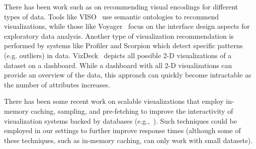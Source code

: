 There has been work such as\break
\cite{Mackinlay:1986:ADG:22949.22950, DBLP:journals/tvcg/MackinlayHS07} 
on recommending visual encodings for different types of data.
Tools like VISO~\cite{polowinski2013viso} use semantic ontologies to recommend visualizations,
while those like Voyager~\cite{wongvoyager2015} focus on the interface design aspects
for exploratory data analysis.
Another type of visualization recommendation is performed by systems like
Profiler and Scorpion \cite{DBLP:conf/avi/KandelPPHH12, scorpion} which detect specific 
patterns (e.g. outliers) in data.
VizDeck~\cite{DBLP:conf/sigmod/KeyHPA12}
depicts all possible 2-D visualizations of a dataset on a dashboard.
While a dashboard with all 2-D visualizations can provide an overview of the data, 
this approach can quickly become intractable as the number of attributes increases.


  There has been some recent work on
scalable visualizations that employ in-memory caching, sampling, and
pre-fetching to improve the interactivity of visualization systems
backed by
databases (e.g.,~\cite{doshi2003prefetching,DBLP:journals/corr/KimBPIMR14}).
Such techniques could be employed in our settings to further improve
response times (although some of these techniques, such as in-memory caching,
can only work with small datasets).


